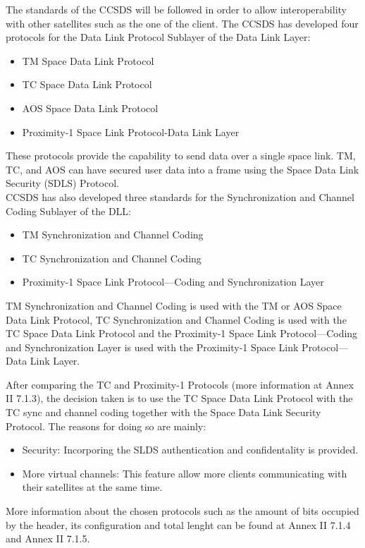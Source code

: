 The standards of the CCSDS will be followed in order to allow interoperability with other satellites such as the one of the client. The CCSDS has developed four protocols for the Data Link Protocol Sublayer of the Data Link Layer\cite{Secretariat2014}:
\begin{itemize}
\item TM Space Data Link Protocol
\item TC Space Data Link Protocol
\item AOS Space Data Link Protocol
\item Proximity-1 Space Link Protocol-Data Link Layer
\end{itemize}
These protocols provide the capability to send data over a single space link. TM, TC, and AOS can have secured user data into a frame using the Space Data Link Security (SDLS) Protocol.\\
 CCSDS has also developed three standards for the Synchronization and Channel Coding Sublayer of the DLL:
 \begin{itemize}
 \item TM Synchronization and Channel Coding
 \item TC Synchronization and Channel Coding
 \item Proximity-1 Space Link Protocol—Coding and Synchronization Layer
 \end{itemize}
TM Synchronization and Channel Coding is used with the TM or AOS Space Data Link
Protocol, TC Synchronization and Channel Coding is used with the TC Space Data Link Protocol and the Proximity-1 Space Link Protocol—Coding and Synchronization Layer is
used with the Proximity-1 Space Link Protocol—Data Link Layer. 

After comparing the TC and Proximity-1 Protocols (more information at Annex II 7.1.3), the decision taken is to use the TC Space Data Link Protocol with the TC sync and channel coding together with the Space Data Link Security Protocol. The reasons for doing so are mainly:
\begin{itemize}
\item Security: Incorporing the SLDS authentication and confidentality is provided.
\item More virtual channels: This feature allow more clients communicating with their satellites at the same time.
\end{itemize}
More information about the chosen protocols such as the amount of bits occupied by the header, its configuration and total lenght can be found at Annex II 7.1.4 and Annex II 7.1.5.

%
% 
%